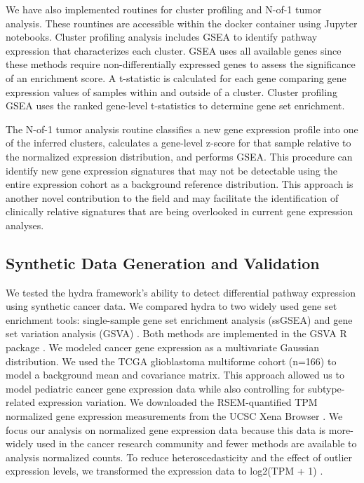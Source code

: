 \documentclass[10pt,letterpaper]{article}
\begin{document}
We have also implemented routines for cluster profiling and N-of-1 tumor analysis. These rountines are accessible within the docker container using Jupyter notebooks. Cluster profiling analysis includes GSEA to identify pathway expression that characterizes each cluster. GSEA uses all available genes since these methods require non-differentially expressed genes to assess the significance of an enrichment score. A t-statistic is calculated for each gene comparing gene expression values of samples within and outside of a cluster. Cluster profiling GSEA uses the ranked gene-level t-statistics to determine gene set enrichment. 

The N-of-1 tumor analysis routine classifies a new gene expression profile into one of the inferred clusters, calculates a gene-level z-score for that sample relative to the normalized expression distribution, and performs GSEA. This procedure can identify new gene expression signatures that may not be detectable using the entire expression cohort as a background reference distribution. This approach is another novel contribution to the field and may facilitate the identification of clinically relative signatures that are being overlooked in current gene expression analyses.

\subsection*{Synthetic Data Generation and Validation}
We tested the hydra framework's ability to detect differential pathway expression using synthetic cancer data. We compared hydra to two widely used gene set enrichment tools: single-sample gene set enrichment analysis (ssGSEA) and gene set variation analysis (GSVA) \cite{barbieSystematicRNAInterference2009, hanzelmannGSVAGeneSet2013, tarcaComparisonGeneSet2013}. Both methods are implemented in the GSVA R package \cite{hanzelmannGSVAGeneSet2013}. We modeled cancer gene expression as a multivariate Gaussian distribution. We used the TCGA glioblastoma multiforme cohort (n=166) to model a background mean and covariance matrix. This approach allowed us to model pediatric cancer gene expression data while also controlling for subtype-related expression variation. We downloaded the RSEM-quantified TPM normalized gene expression measurements from the UCSC Xena Browser \cite{goldmanUCSCXenaPlatform2018}. We focus our analysis on normalized gene expression data because this data is more-widely used in the cancer research community and fewer methods are available to analysis normalized counts. To reduce heteroscedasticity and the effect of outlier expression levels, we transformed the expression data to log2(TPM + 1) \cite{zwienerTransformingRNASeqData2014}.
 
\end{document}
